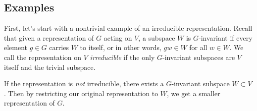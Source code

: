 \subsection{Examples}



First, let's start with a nontrivial example of an irreducible representation. Recall that given a representation of $G$ acting on $V$, a subspace $W$ is $G$-invariant if every element $g \in G$ carries $W$ to itself, or in other words, $gw \in W$ for all $w \in W$. We call the representation on $V$ \emph{irreducible} if the only $G$-invariant subspaces are $V$ itself and the trivial subspace.

If the representation is \emph{not} irreducible, there exists a $G$-invariant subspace $W \subset V$. Then by restricting our original representation to $W$, we get a smaller representation of $G$. 

